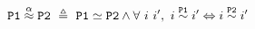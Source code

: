 \documentclass{article}
\begin{document}
\pagestyle{empty}
\noindent
\begin{minipage}{10.3cm}
\medskip
      $$\mtt{P1} \aeq \mtt{P2}\ \triangleq\ \mtt{P1} \simeq \mtt{P2} \wedge \forall\ i\ i',\ i \seq{\mtt{P1}} i' \Leftrightarrow i \seq{\mtt{P2}} i' \bigskip$$
\end{minipage}
\end{document}
